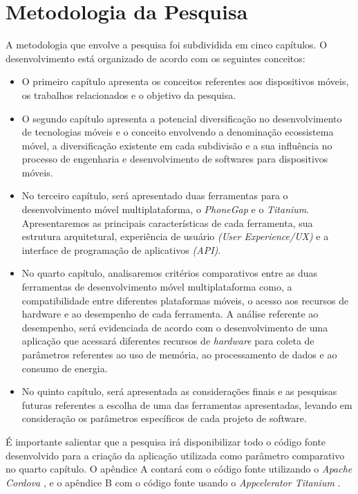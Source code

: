 \section{Metodologia da Pesquisa} %
\label{sec:metodologia_de_pesquisa}
A metodologia que envolve a pesquisa foi subdividida em cinco capítulos. O
desenvolvimento está organizado de acordo com os seguintes conceitos:
\begin{itemize}
  \item O primeiro capítulo apresenta os conceitos referentes
    aos dispositivos móveis, os trabalhos relacionados e o objetivo da pesquisa.
  \item O segundo capítulo apresenta a potencial diversificação no
   desenvolvimento de tecnologias móveis e o conceito envolvendo a
   denominação ecossistema móvel, a diversificação existente em cada subdivisão
   e a sua influência no processo de engenharia e desenvolvimento de softwares
   para dispositivos móveis.
  \item No terceiro capítulo, será apresentado duas ferramentas para o
   desenvolvimento móvel multiplataforma, o \textit{PhoneGap} e o
   \textit{Titanium}. Apresentaremos as principais características de cada
   ferramenta, sua estrutura arquitetural, experiência de usuário
   \textit{(User Experience/UX)} e a interface de programação de aplicativos
   \textit{(API)}.
  \item No quarto capítulo, analisaremos critérios comparativos entre as
   duas ferramentas de desenvolvimento móvel multiplataforma como, a
   compatibilidade entre diferentes plataformas móveis, o acesso aos recursos de
   hardware e ao desempenho de cada ferramenta. A análise referente ao
   desempenho, será evidenciada de acordo com o desenvolvimento de uma
   aplicação que acessará diferentes recursos de \textit{hardware} para coleta de
   parâmetros referentes ao uso de memória, ao processamento de dados e ao
   consumo de energia.
  \item No quinto capítulo, será apresentada as considerações finais e as
   pesquisas futuras referentes a escolha de uma das ferramentas apresentadas,
   levando em consideração os parâmetros específicos de cada projeto de software.
\end{itemize}

É importante salientar que a pesquisa irá disponibilizar todo o código fonte
desenvolvido para a criação da aplicação utilizada como parâmetro comparativo
no quarto capítulo. O apêndice A contará com o código fonte utilizando o \textit{Apache Cordova} \textsuperscript{\texttrademark}, e o apêndice B com o código
fonte usando o \textit{Appcelerator Titanium} \textsuperscript{\texttrademark}.


